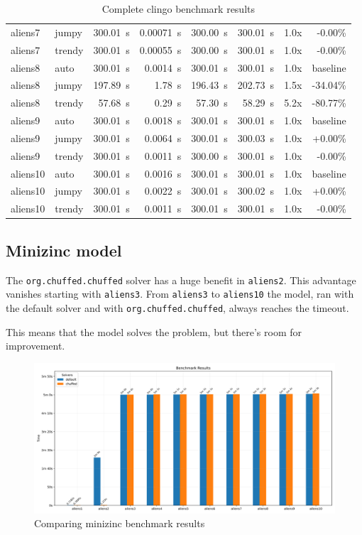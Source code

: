 \documentclass[11pt]{article}
\begin{document}
\begin{table}[h]
\begin{tabular}{|llrrrrrr|}
    aliens7 & jumpy & 300.01~s & 0.00071~s & 300.00~s & 300.01~s & 1.0x & -0.00\% \\
    aliens7 & trendy & 300.01~s & 0.00055~s & 300.00~s & 300.01~s & 1.0x & -0.00\% \\
    \hline
    aliens8 & auto & 300.01~s & 0.0014~s & 300.01~s & 300.01~s & 1.0x & baseline \\
    aliens8 & jumpy & 197.89~s & 1.78~s & 196.43~s & 202.73~s & 1.5x & -34.04\% \\
    aliens8 & trendy & 57.68~s & 0.29~s & 57.30~s & 58.29~s & 5.2x & -80.77\% \\
    \hline
    aliens9 & auto & 300.01~s & 0.0018~s & 300.01~s & 300.01~s & 1.0x & baseline \\
    aliens9 & jumpy & 300.01~s & 0.0064~s & 300.01~s & 300.03~s & 1.0x & +0.00\% \\
    aliens9 & trendy & 300.01~s & 0.0011~s & 300.00~s & 300.01~s & 1.0x & -0.00\% \\
    \hline
    aliens10 & auto & 300.01~s & 0.0016~s & 300.01~s & 300.01~s & 1.0x & baseline \\
    aliens10 & jumpy & 300.01~s & 0.0022~s & 300.01~s & 300.02~s & 1.0x & +0.00\% \\
    aliens10 & trendy & 300.01~s & 0.0011~s & 300.01~s & 300.01~s & 1.0x & -0.00\% \\
    \hline
  \end{tabular}
  \caption{Complete clingo benchmark results}
  \label{table:clingo-bench-comparative}
\end{table}

\subsection{Minizinc model}

The \texttt{org.chuffed.chuffed} solver has a huge benefit in \texttt{aliens2}.
This advantage vanishes starting with \texttt{aliens3}.
From \texttt{aliens3} to \texttt{aliens10} the model, ran with the default solver and with \texttt{org.chuffed.chuffed}, always reaches the timeout.

This means that the model solves the problem, but there's room for improvement.


\begin{figure}[h]
  \centering
  \includegraphics[width=\textwidth]{./minizinc/benchmarks/balanced_comparative.png}
  \caption{Comparing minizinc benchmark results}
  \label{fig:minizinc-bench-comparative}
\end{figure}
\end{document}
